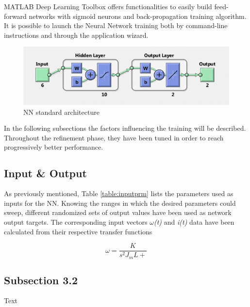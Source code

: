 MATLAB Deep Learning Toolbox offers functionalities to easily build feed-forward networks with sigmoid neurons and back-propagation training algorithm. It is possible to launch the Neural Network training both by command-line instructions and through the application wizard.

\begin{figure}[h!]
	\centering
	\includegraphics[scale=1]{Images/nftool.png}
	\caption{NN standard architecture}
	\label{fig:nftoolarch}
\end{figure}

In the following subsections the factors influencing the training will be described. Throughout the refinement phase, they have been tuned in order to reach progressively better performance.


\subsection{Input \& Output}

As previously mentioned, Table \ref{table:inputprm} lists the parameters used as inputs for the NN. 
Knowing the ranges in which the desired parameters could sweep, different randomized sets of output values have been used as network output targets. 
The corresponding input vectors \textit{$ \omega $(t)} and \textit{i(t)} data have been calculated from their respective transfer functions

\begin{equation}
	\omega = \dfrac{K}{s^2J_mL+}
\end{equation} 


\subsection{Subsection 3.2}

Text


